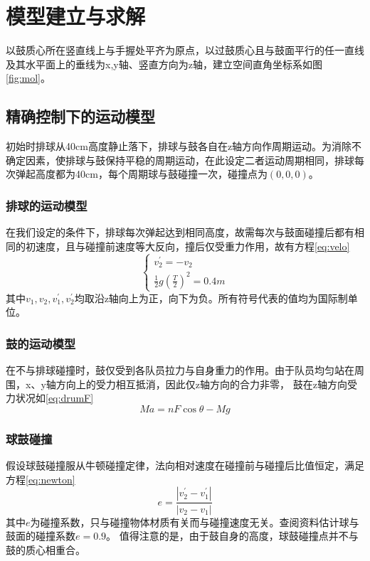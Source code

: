 \documentclass[withoutpreface,bwprint]{cumcmthesis} %
\begin{document}
\section{模型建立与求解}
以鼓质心所在竖直线上与手握处平齐为原点，以过鼓质心且与鼓面平行的任一直线及其水平面上的垂线为x,y轴、竖直方向为z轴，建立空间直角坐标系如图\ref{fig:mol}。

\subsection{精确控制下的运动模型}
初始时排球从40cm高度静止落下，排球与鼓各自在z轴方向作周期运动。为消除不确定因素，使排球与鼓保持平稳的周期运动，在此设定二者运动周期相同，排球每次弹起高度都为40cm，每个周期球与鼓碰撞一次，碰撞点为$(0,0,0)$。
\subsubsection{排球的运动模型}
在我们设定的条件下，排球每次弹起达到相同高度，故需每次与鼓面碰撞后都有相同的初速度，且与碰撞前速度等大反向，撞后仅受重力作用，故有方程\ref{eq:velo}
\begin{equation}
\left\{
\begin{array}{lr}
v_2^{'}=-v_2 \\
\frac{1}{2}g(\frac{T}{2})^2=0.4m
\end{array}
\right.
\label{eq:velo}
\end{equation}
其中$v_1, v_2, v_1^{'}, v_2^{'}$均取沿z轴向上为正，向下为负。所有符号代表的值均为国际制单位。
\subsubsection{鼓的运动模型}
在不与排球碰撞时，鼓仅受到各队员拉力与自身重力的作用。由于队员均匀站在周围，x、y轴方向上的受力相互抵消，因此仅z轴方向的合力非零，
鼓在z轴方向受力状况如\ref{eq:drumF}
\begin{equation}
Ma=nF\cos\theta-Mg
\label{eq:drumF}
\end{equation}
\subsubsection{球鼓碰撞}
假设球鼓碰撞服从牛顿碰撞定律，法向相对速度在碰撞前与碰撞后比值恒定，满足方程\ref{eq:newton}
\begin{equation}
	e=\frac{|v_2^{'}-v_1^{'}|}{|v_2-v_1|}
	\label{eq:newton}
\end{equation} 
其中$e$为碰撞系数，只与碰撞物体材质有关而与碰撞速度无关。查阅资料估计球与鼓面的碰撞系数$e=0.9$。
值得注意的是，由于鼓自身的高度，球鼓碰撞点并不与鼓的质心相重合。
\end{document}
